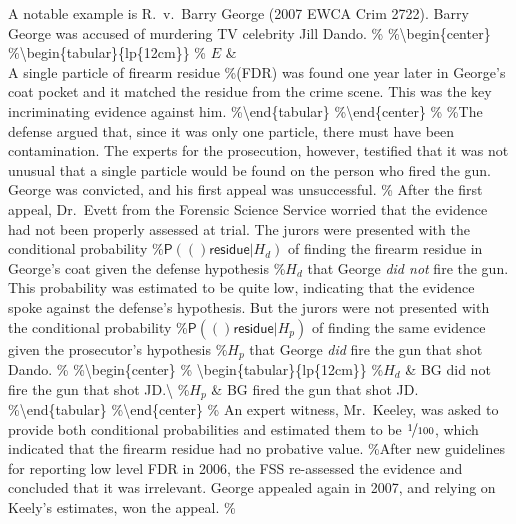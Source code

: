 \documentclass[10pt,dvipsnames,enabledeprecatedfontcommands]{scrartcl}
\newcommand{\pr}[1]{\mathsf{P}(#1)}
\begin{document}
A notable example is R.~v.~Barry George (2007 EWCA Crim 2722). Barry
George was accused of murdering TV celebrity Jill Dando. \%
\%\textbackslash{}begin\{center\}
\%\textbackslash{}begin\{tabular\}\{lp\{12cm\}\} \% \(E\) \&\\
A single particle of firearm residue \%(FDR) was found one year later in
George's coat pocket and it matched the residue from the crime scene.
This was the key incriminating evidence against him.
\%\textbackslash{}end\{tabular\} \%\textbackslash{}end\{center\} \%
\%\noindent  The defense argued that, since it was only one particle,
there must have been contamination. The experts for the prosecution,
however, testified that it was not unusual that a single particle would
be found on the person who fired the gun. George was convicted, and his
first appeal was unsuccessful. \% After the first appeal, Dr.~Evett from
the Forensic Science Service worried that the evidence had not been
properly assessed at trial. The jurors were presented with the
conditional probability \%\(\pr(\textsf{residue}\vert H_d)\) of finding
the firearm residue in George's coat given the defense hypothesis
\%\(H_d\) that George \textit{did not} fire the gun. This probability
was estimated to be quite low, indicating that the evidence spoke
against the defense's hypothesis. But the jurors were not presented with
the conditional probability \%\(\pr(\textsf{residue}\vert H_p)\) of
finding the same evidence given the prosecutor's hypothesis \%\(H_p\)
that George \textit{did} fire the gun that shot Dando. \%
\%\textbackslash{}begin\{center\} \%
\textbackslash{}begin\{tabular\}\{lp\{12cm\}\} \%\(H_d\) \& BG did not
fire the gun that shot JD.\textbackslash{} \%\(H_p\) \& BG fired the gun
that shot JD. \%\textbackslash{}end\{tabular\}
\%\textbackslash{}end\{center\} \% \noindent  An expert witness,
Mr.~Keeley, was asked to provide both conditional probabilities and
estimated them to be \(\nicefrac{1}{100}\), which indicated that the
firearm residue had no probative value. \%After new guidelines for
reporting low level FDR in 2006, the FSS re-assessed the evidence and
concluded that it was irrelevant. George appealed again in 2007, and
relying on Keely's estimates, won the appeal. \%
\end{document}
